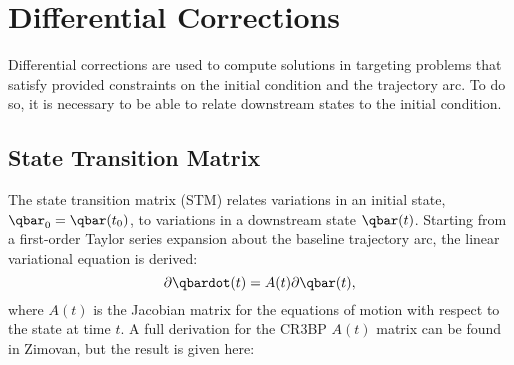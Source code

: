 \section{Differential Corrections}
Differential corrections are used to compute solutions in targeting problems
that satisfy provided constraints on the initial condition and the trajectory
arc. To do so, it is necessary to be able to relate downstream states to the
initial condition.

\subsection{State Transition Matrix}
The state transition matrix (STM) relates variations in an initial state,
$\qbar_{0}=\qbar(t_{0})$, to variations in a downstream state $\qbar(t)$.
Starting from a first-order Taylor series expansion about the baseline
trajectory arc, the linear variational equation is derived:
\begin{equation}
    \partial\qbardot(t)=A(t)\partial\qbar(t),
    \label{eq:linearvariational}
\end{equation}
where $A(t)$ is the Jacobian matrix for the equations of motion with respect to
the state at time $t$. A full derivation for the CR3BP $A(t)$ matrix can be
found in Zimovan, but the result is given here\cite{Zimovan:2017}:
